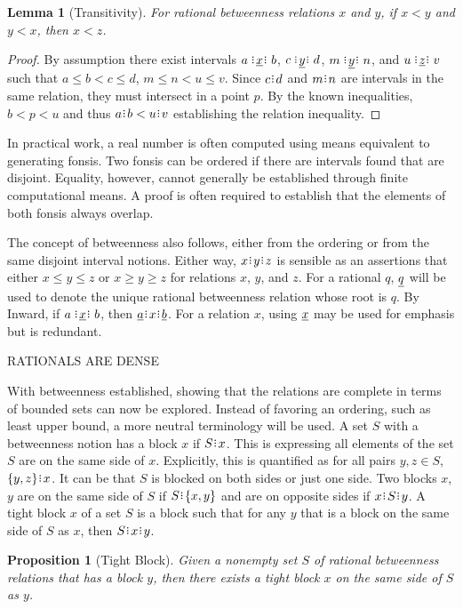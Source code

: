 \documentclass[12pt]{article}
\newtheorem{lemma}{Lemma}[section]
\newtheorem{proposition}{Proposition}[section]
\newcommand{\yrel}{\xrel[y]}
\begin{document}
\begin{lemma}[Transitivity]
For rational betweenness relations $x$ and $y$, if $x < y$ and $y < x$, then $x < z$.
\end{lemma}

\begin{proof}
    By assumption there exist intervals $a \xrel b$, $c \yrel d$, $m \yrel n$, and $u \xrel[z] v$ such that $a \leq b < c \leq d$, $m \leq n < u \leq v$. Since $c\rint d$ and $m \rint n$ are intervals in the same relation, they must intersect in a point $p$. By the known inequalities, $b < p < u$ and thus $a \rint b < u \rint v$ establishing the relation inequality. 
\end{proof}

In practical work, a real number is often computed using means equivalent to generating fonsis. Two fonsis can be ordered if there are intervals found that are disjoint. Equality, however, cannot generally be established through finite computational means. A proof is often required to establish that the elements of both fonsis always overlap. 

The concept of betweenness also follows, either from the ordering or from the same disjoint interval notions. Either way, $x \rint y \rint z$ is sensible as an assertions that either  $ x \leq y \leq z$  or $x \geq y \geq z$ for relations $x$, $y$, and $z$. For a rational $q$, $\underline{q}$ will be used to denote the unique rational betweenness relation whose root is $q$. By Inward, if $a \xrel b$, then $\qrel{a} \rint x \rint \qrel{b}$. For a relation $x$, using $\underline{x}$ may be used for emphasis but is redundant. 

RATIONALS ARE DENSE


With betweenness established, showing that the relations are complete in terms of bounded sets can now be explored. Instead of favoring an ordering, such as least upper bound, a more neutral terminology will be used. A set $S$ with a betweenness notion has a block $x$ if $S \rint x$. This is expressing all elements of the set $S$ are on the same side of $x$. Explicitly, this is quantified as for all pairs $y, z \in S$, $\{y, z\} \rint x$. It can be that $S$ is blocked on both sides or just one side. Two blocks $x$, $y$ are on the same side of $S$ if $S \rint \{x, y\}$ and are on opposite sides if $x \rint S \rint y$. A tight block $x$ of a set $S$ is a block such that for any $y$ that is a block on the same side of $S$ as $x$, then $S \rint x \rint y$. 


\begin{proposition}[Tight Block]
    Given a nonempty set $S$ of rational betweenness relations that has a block $y$, then there exists a tight block $x$ on the same side of $S$ as $y$. 
\end{proposition}
\end{document}
